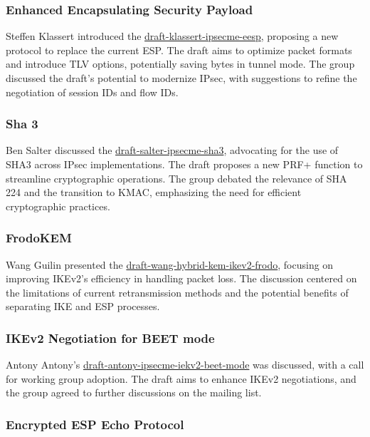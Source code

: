 \documentclass{article}
\begin{document}
\subsubsection{Enhanced Encapsulating Security Payload}

Steffen Klassert introduced the \href{https://datatracker.ietf.org/doc/html/draft-klassert-ipsecme-eesp}{draft-klassert-ipsecme-eesp}, proposing a new protocol to replace the current ESP. The draft aims to optimize packet formats and introduce TLV options, potentially saving bytes in tunnel mode. The group discussed the draft's potential to modernize IPsec, with suggestions to refine the negotiation of session IDs and flow IDs.

\subsubsection{Sha 3}

Ben Salter discussed the \href{https://datatracker.ietf.org/doc/html/draft-salter-ipsecme-sha3}{draft-salter-ipsecme-sha3}, advocating for the use of SHA3 across IPsec implementations. The draft proposes a new PRF+ function to streamline cryptographic operations. The group debated the relevance of SHA 224 and the transition to KMAC, emphasizing the need for efficient cryptographic practices.

\subsubsection{FrodoKEM}

Wang Guilin presented the \href{https://datatracker.ietf.org/doc/html/draft-wang-hybrid-kem-ikev2-frodo}{draft-wang-hybrid-kem-ikev2-frodo}, focusing on improving IKEv2's efficiency in handling packet loss. The discussion centered on the limitations of current retransmission methods and the potential benefits of separating IKE and ESP processes.

\subsubsection{IKEv2 Negotiation for BEET mode}

Antony Antony's \href{https://datatracker.ietf.org/doc/html/draft-antony-ipsecme-iekv2-beet-mode}{draft-antony-ipsecme-iekv2-beet-mode} was discussed, with a call for working group adoption. The draft aims to enhance IKEv2 negotiations, and the group agreed to further discussions on the mailing list.

\subsubsection{Encrypted ESP Echo Protocol}
\end{document}
